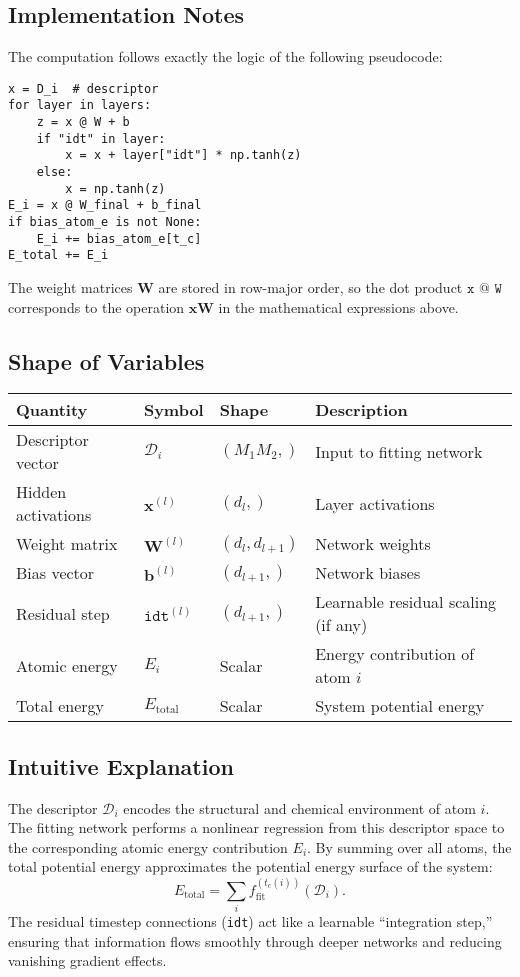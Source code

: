\documentclass[12pt,a4paper]{article}
\begin{document}
\subsection*{Implementation Notes}

The computation follows exactly the logic of the following pseudocode:

\begin{verbatim}
x = D_i  # descriptor
for layer in layers:
    z = x @ W + b
    if "idt" in layer:
        x = x + layer["idt"] * np.tanh(z)
    else:
        x = np.tanh(z)
E_i = x @ W_final + b_final
if bias_atom_e is not None:
    E_i += bias_atom_e[t_c]
E_total += E_i
\end{verbatim}

The weight matrices $\mathbf{W}$ are stored in row-major order, 
so the dot product $\texttt{x @ W}$ corresponds to the operation $\mathbf{x}\mathbf{W}$ in the mathematical expressions above.

\subsection*{Shape of Variables}

\begin{center}
\begin{tabular}{@{}llll@{}}
\toprule
Quantity & Symbol & Shape & Description \\
\midrule
Descriptor vector & $\bm{\mathcal{D}}_i$ & $(M_1 M_2,)$ & Input to fitting network \\
Hidden activations & $\mathbf{x}^{(l)}$ & $(d_l,)$ & Layer activations \\
Weight matrix & $\mathbf{W}^{(l)}$ & $(d_l, d_{l+1})$ & Network weights \\
Bias vector & $\mathbf{b}^{(l)}$ & $(d_{l+1},)$ & Network biases \\
Residual step & $\texttt{idt}^{(l)}$ & $(d_{l+1},)$ & Learnable residual scaling (if any) \\
Atomic energy & $E_i$ & Scalar & Energy contribution of atom $i$ \\
Total energy & $E_{\text{total}}$ & Scalar & System potential energy \\
\bottomrule
\end{tabular}
\end{center}

\subsection*{Intuitive Explanation}

The descriptor $\bm{\mathcal{D}}_i$ encodes the structural and chemical environment of atom $i$.
The fitting network performs a nonlinear regression from this descriptor space to the corresponding 
atomic energy contribution $E_i$.  
By summing over all atoms,
the total potential energy approximates the potential energy surface of the system:
\[
E_{\text{total}} = \sum_{i} f_{\text{fit}}^{(t_c(i))}(\bm{\mathcal{D}}_i).
\]
The residual timestep connections (\texttt{idt}) act like a learnable “integration step,” 
ensuring that information flows smoothly through deeper networks and reducing vanishing gradient effects.
\end{document}
